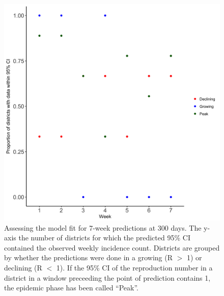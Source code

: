\documentclass[a4paper,12pt]{article}
\begin{document}
  \begin{figure}
    \centering
    \includegraphics[scale =
    0.15]{ms6-figures/goodness_districts_500.png}
    \caption{Assessing the model fit for 7-week predictions at 300
      days. The y-axis the number of districts for which the predicted
      95\% CI contained the observed weekly incidence count. Districts
    are grouped by whether the predictions were done in a growing (R $>$
    1) or declining (R $<$ 1). If the 95\% CI of the reproduction number
    in a district in a window
  preceeding the point of prediction contains 1, the epidemic phase
  has been called ``Peak''.}
  \label{fig:gf_500}
  \end{figure}
\end{document}
